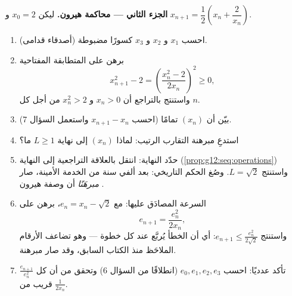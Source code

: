 \begin{problem}
\medskip
\noindent\textbf{الجزء الثاني --- محاكمة هيرون.}
ليكن $x_0 = 2$ و $x_{n+1} = \dfrac12\left(x_n +
\dfrac{2}{x_n}\right)$.
\begin{enumerate}[resume]
  \item احسب $x_1$ و $x_2$ و $x_3$ كسورًا مضبوطة (أصدقاء
        قدامى).
  \item برهن على المتطابقة المفتاحية
        \[
        x_{n+1}^2 - 2 = \left(\frac{x_n^2 - 2}{2x_n}\right)^{\!2}
        \geq 0,
        \]
        واستنتج بالتراجع أن $x_n > 0$ و
        $x_n^2 > 2$ من أجل كل $n$.
  \item بيّن أن $(x_n)$  تمامًا (احسب
        $x_{n+1} - x_n$ واستعمل السؤال 7).
  \item استدعِ مبرهنة التقارب الرتيب: لماذا 
        $(x_n)$ إلى نهاية $L \geq 1$ ما؟
  \item حدّد النهاية: انتقل بالعلاقة التراجعية إلى النهاية
        (\cref{prop:g12:seq:operations}) واستنتج
        $L = \sqrt2$. وصُغ الحكم التاريخي: بعد ألفي
        سنة من الخدمة الأمينة، صار \emph{مبرهَنًا} أن وصفة هيرون
        .
  \item السرعة المصادَق عليها: مع $e_n = x_n - \sqrt2$، برهن على
        \[
        e_{n+1} = \frac{e_n^2}{2 x_n} ,
        \]
        واستنتج $e_{n+1} \leq \frac{e_n^2}{2\sqrt2}$: أي أن
        الخطأ يُربَّع عند كل خطوة --- وهو تضاعف الأرقام
        الملاحَظ منذ الكتاب السابق، وقد صار مبرهنة.
  \item تأكد عدديًا: احسب $e_0, e_1, e_2, e_3$ (انطلاقًا من
        السؤال 6) وتحقق من أن كل $\frac{e_{n+1}}{e_n^2}$
        قريب من $\frac{1}{2x_n}$.
\end{enumerate}


\end{problem}
